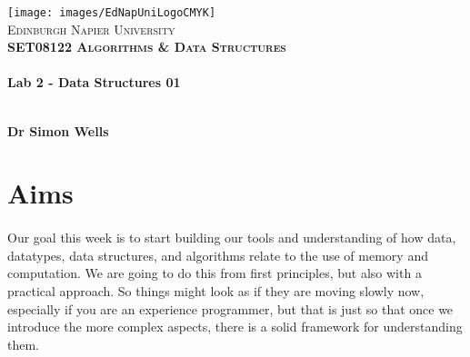 \documentclass[10pt, a4paper, twosize]{article}
\begin{document}

\begin{titlepage}
\vspace*{5cm}
\begin{center}
\texttt{[image: images/EdNapUniLogoCMYK]}~\\[1cm]

\textsc{\Large Edinburgh Napier University}\\[1.5cm]

\textsc{\LARGE \bfseries SET08122 Algorithms \& Data Structures}\\[0.5cm]

\hrulefill \\[0.4cm]
{\huge \bfseries Lab 2 - Data Structures 01 \\[0.4cm] }
\hrulefill \\[1.5cm]

\begin{minipage}{0.4\textwidth}
\begin{flushleft} \large
\textbf{Dr Simon Wells} \\
\end{flushleft}
\end{minipage}

\vfill

\end{center}
\end{titlepage}




%

\section{Aims}
\paragraph{} Our goal this week is to start building our tools and understanding of how data, datatypes, data structures, and algorithms relate to the use of memory and computation. We are going to do this from first principles, but also with a practical approach. So things might look as if they are moving slowly now, especially if you are an experience programmer, but that is just so that once we introduce the more complex aspects, there is a solid framework for understanding them.
\end{document}

